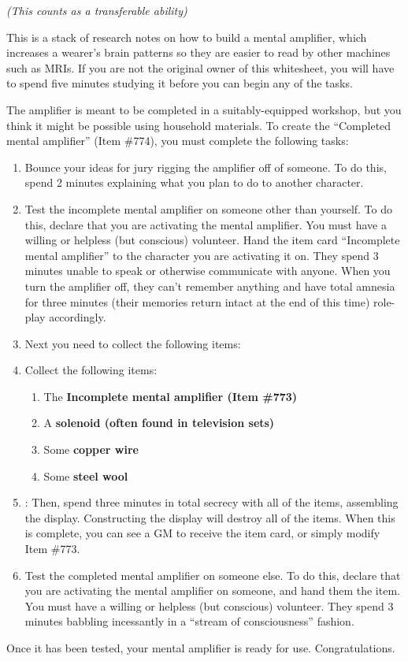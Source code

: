 \documentclass[white]{guildcamp1}
\begin{document}
\name{\wMentalAmplifier{}}

\emph{(This counts as a transferable ability)}

This is a stack of research notes on how to build a mental amplifier, which increases a wearer's brain patterns so they are easier to read by other machines such as MRIs. If you are not the original owner of this whitesheet, you will have to spend five minutes studying it before you can begin any of the tasks.

The amplifier is meant to be completed in a suitably-equipped workshop, but you think it might be possible using household materials. To create the ``Completed mental amplifier'' (Item \#774), you must complete the following tasks: 

\begin{enumerate}
\item Bounce your ideas for jury rigging the amplifier off of someone. To do this, spend 2 minutes explaining what you plan to do to another character.
\item Test the incomplete mental amplifier on someone other than yourself. To do this, declare that you are activating the mental amplifier. You must have a willing or helpless (but conscious) volunteer. Hand the item card ``Incomplete mental amplifier'' to the character you are activating it on. They spend 3 minutes unable to speak or otherwise communicate with anyone. When you turn the amplifier off, they can't remember anything and have total amnesia for three minutes (their memories return intact at the end of this time) role-play accordingly. 
\item  Next you need to collect the following items:
\item Collect the following items:
\begin{enumerate}
\item The  \bf{Incomplete mental amplifier} (Item \#773)
\item A \bf{solenoid} (often found in television sets)
\item Some \bf{copper wire}
\item Some \bf{steel wool}
\end{enumerate}
\item: Then, spend three minutes in total secrecy with all of the items, assembling the display. Constructing the display will destroy all of the items.  When this is complete, you can see a GM to receive the item card, or simply modify Item \#773.
\item Test the completed mental amplifier on someone else. To do this, declare that you are activating the mental amplifier on someone, and hand them the item. You must have a willing or helpless (but conscious) volunteer. They spend 3 minutes babbling incessantly in a ``stream of consciousness'' fashion.
\end{enumerate}

Once it has been tested, your mental amplifier is ready for use. Congratulations.
\end{document}
